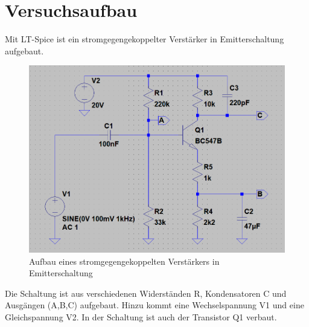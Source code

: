 \chapter{Versuchsaufbau}
    Mit LT-Spice ist ein stromgegengekoppelter Verstärker in Emitterschaltung aufgebaut.
    \begin{figure}[h!]
        \centering
        \includegraphics[width=0.7\linewidth]{2.PNG}
        \caption{Aufbau eines stromgegengekoppelten Verstärkers in Emitterschaltung}
    \end{figure}

    Die Schaltung ist aus verschiedenen Widerständen R, Kondensatoren C und Ausgängen (A,B,C) aufgebaut. Hinzu kommt eine Wechselspannung V1 und eine Gleichspannung V2. In der Schaltung ist auch der Transistor Q1 verbaut.